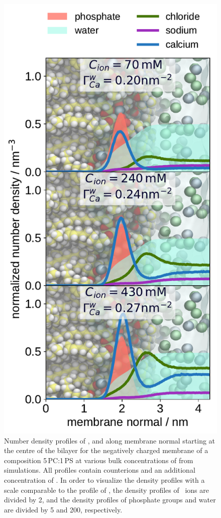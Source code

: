 \begin{figure}[htbp!] 
  \centering 
  \includegraphics[width=\figwidth]{../img/ecc_pops/density_profiles_ca_na_cl_wat_phos_models-compar_1-3_CaCl2-series.pdf}
  \caption{\label{fig:cacl-dens_PCPS} 
    Number density profiles of ,  and  along membrane normal starting at the centre of the bilayer 
    for the negatively charged membrane of a composition 5\,PC:1\,PS
    at various bulk concentrations of  from simulations. 
    All profiles contain  counterions and an additional concentration of . 
    In order to visualize the density profiles with a scale comparable to the profile of ,  
    the density profiles of~ ions are divided by 2, and 
    the density profiles of phosphate groups and water are divided by 5 and 200, respectively.  
    } 
\end{figure} 

